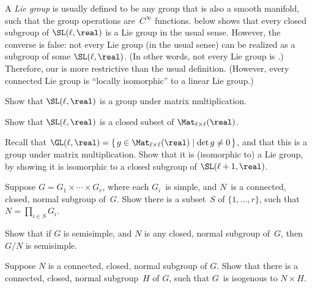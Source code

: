 \begin{warn}
A \emph{Lie group} is usually defined to be any group that is also a smooth manifold, such that the group operations are~$C^\infty$ functions.  below shows that every closed subgroup of $\SL(\ell,\real)$ is a Lie group in the usual sense. However, the converse is false: not every Lie group (in the usual sense) can be realized as a subgroup of some $\SL(\ell,\real)$. (In other words, not every Lie group is .) Therefore, our  is more restrictive than the usual definition.
(However, every connected Lie group is ``locally isomorphic'' to a linear Lie group.) 
\end{warn}



\begin{exercises}

\item \label{SLisGrp}
Show that $\SL(\ell,\real)$ is a group under matrix multiplication.

\item \label{SLisClosed}
Show that $\SL(\ell,\real)$ is a closed subset of $\Mat_{\ell\times\ell}(\real)$.

\item Recall that
	$\GL(\ell,\real) = \{\, g \in \Mat_{\ell\times\ell}(\real) \mid \det g \neq 0 \,\}$, and that this is a group under matrix multiplication. Show that it is (isomorphic to) a Lie group, by showing it is isomorphic to a closed subgroup of $\SL(\ell+1,\real)$.

\item \label{Normal=ProdGi}
Suppose $G = G_1 \times \cdots \times G_r$, where each $G_i$~is
simple, and $N$~is a connected, closed, normal subgroup
of~$G$. Show there is a subset~$S$ of
$\{1,\ldots,r\}$, such that $N = \prod_{i \in S} G_i$.

\item Show that if $G$ is semisimple, and $N$ is any closed,
normal subgroup of~$G$, then $G/N$ is semisimple.

\item \label{G=NxH}
 Suppose $N$ is a connected, closed, normal subgroup
of $G$. Show that there is a connected, closed, normal
subgroup~$H$ of $G$, such that $G$~is isogenous to $N \times
H$.


\end{exercises}





